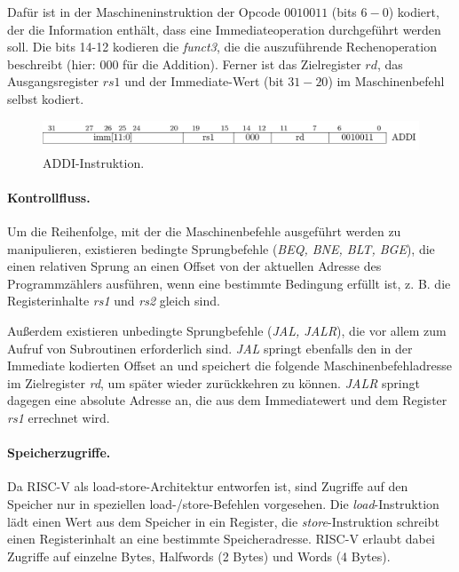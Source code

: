 Dafür ist in der Maschineninstruktion der Opcode $0010011$ (bits $6 - 0$) kodiert, der die Information enthält, dass eine Immediateoperation durchgeführt werden soll. Die bits 14-12 kodieren die \textit{funct3}, die die auszuführende Rechenoperation beschreibt (hier: $000$ für die Addition). Ferner ist das Zielregister $rd$, das Ausgangsregister $rs1$ und der Immediate-Wert (bit $31 - 20$) im Maschinenbefehl selbst kodiert.

\begin{figure} [ht]
  \centering
  \includegraphics[width=\textwidth]{Figures/ADDI}
  \caption{ADDI-Instruktion.}
  \label{fig:addi}
\end{figure}

\paragraph{Kontrollfluss.}
Um die Reihenfolge, mit der die Maschinenbefehle ausgeführt werden zu manipulieren, existieren bedingte Sprungbefehle (\textit{BEQ, BNE, BLT, BGE}), die einen relativen Sprung an einen Offset von der aktuellen Adresse des Programmzählers ausführen, wenn eine bestimmte Bedingung erfüllt ist, z. B. die Registerinhalte \emph{rs1} und \emph{rs2} gleich sind.

Außerdem existieren unbedingte Sprungbefehle (\textit{JAL, JALR}), die vor allem zum Aufruf von Subroutinen erforderlich sind. \emph{JAL} springt ebenfalls den in der Immediate kodierten Offset an und speichert die folgende Maschinenbefehladresse im Zielregister \emph{rd}, um später wieder zurückkehren zu können. \emph{JALR} springt dagegen eine absolute Adresse an, die aus dem Immediatewert und dem Register \emph{rs1} errechnet wird.

\paragraph{Speicherzugriffe.}
Da RISC-V als load-store-Architektur entworfen ist, sind Zugriffe auf den Speicher nur in speziellen load-/store-Befehlen vorgesehen. Die \textit{load}-Instruktion lädt einen Wert aus dem Speicher in ein Register, die \textit{store}-Instruktion schreibt einen Registerinhalt an eine bestimmte Speicheradresse. RISC-V erlaubt dabei Zugriffe auf einzelne Bytes, Halfwords (2 Bytes) und Words (4 Bytes).

